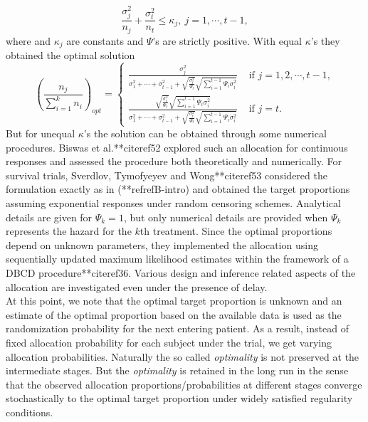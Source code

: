 $$\frac{\sigma_{j}^{2}}{n_{j}}+\frac{\sigma_{t}^{2}}{n_{t}}\leq \kappa_{j}, ~j=1,\cdots ,t-1,$$
where and $\kappa_{j}$ are constants and $\Psi$'s are strictly positive. With equal $\kappa$'s they obtained the optimal solution
\[\left(\frac{n_{j}}{\sum_{i=1}^{k}n_{i}}\right)_{opt} = \left\{
\begin{array}{ll}
\frac{\sigma_{j}^{2}}{\sigma_{1}^{2}+\cdots +\sigma_{t-1}^{2}+\sqrt{\frac{\sigma_{t}^{2}}{\Psi_{t}}}\sqrt{\sum_{i=1}^{t-1}\Psi_{i}\sigma_{i}^{2}}}& \mbox{~if~} j=1,2,\cdots ,t-1,\\
\frac{\sqrt{\frac{\sigma_{t}^{2}}{\Psi_{t}}}\sqrt{\sum_{i=1}^{t-1}\Psi_{i}\sigma_{i}^{2}}}{\sigma_{1}^{2}+\cdots +\sigma_{t-1}^{2}+\sqrt{\frac{\sigma_{t}^{2}}{\Psi_{t}}}\sqrt{\sum_{i=1}^{t-1}\Psi_{i}\sigma_{i}^{2}}} & \mbox{~if~} j=t.
\end{array}
\right. \]
But for unequal $\kappa$'s  the solution can be obtained through some numerical procedures. Biswas et al.**citeref{52}  explored such an allocation for continuous responses and assessed the procedure both theoretically and numerically. For survival trials, Sverdlov, Tymofyeyev and Wong**citeref{53} considered the formulation exactly as in (**refref{B-intro}) and obtained the target proportions assuming exponential responses under random censoring schemes. Analytical details are given for $\Psi_{k}=1$, but only numerical details are provided when $\Psi_{k}$ represents the hazard for the $k$th treatment. Since the optimal proportions depend on unknown parameters, they implemented the allocation using sequentially updated maximum likelihood estimates within the framework of a DBCD procedure**citeref{36}. Various design and inference related aspects of the allocation are investigated even under the presence of delay.\\

\noindent  At this point, we note that the optimal target proportion is unknown and  an estimate of the optimal proportion based on the available data is used as the randomization probability for the next entering patient. As a result, instead of fixed allocation probability for each subject under the trial, we get varying allocation probabilities. Naturally the so called \textit{optimality} is not preserved at the intermediate stages. But the \textit{optimality} is retained in the long run in the sense that the observed allocation proportions/probabilities at different stages converge stochastically to the optimal target proportion under widely satisfied regularity conditions.

